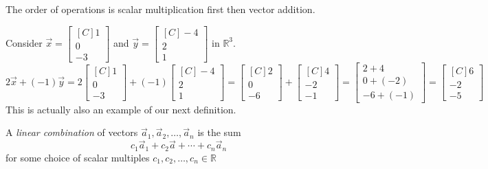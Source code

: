 The order of operations is scalar multiplication first then vector addition.

\begin{example}
Consider $\vec{x}=\begin{bmatrix*}[C]1\\ 0 \\ -3\end{bmatrix*}$ and
$\vec{y}=\begin{bmatrix*}[C]-4\\ 2 \\ 1\end{bmatrix*}$ in $\mathbb{R}^3$.
\[
2\vec{x}+(-1)\vec{y}=
2\begin{bmatrix*}[C]1\\ 0 \\ -3\end{bmatrix*}+
(-1)\begin{bmatrix*}[C]-4\\ 2 \\ 1\end{bmatrix*}=
\begin{bmatrix*}[C]2\\ 0 \\ -6\end{bmatrix*}+
\begin{bmatrix*}[C]4\\ -2 \\ -1\end{bmatrix*}=
\begin{bmatrix}2+4\\ 0+(-2) \\ -6+(-1)\end{bmatrix}=
\begin{bmatrix*}[C]6\\ -2 \\ -5\end{bmatrix*}
\]
This is actually also an example of our next definition.
\end{example}

\begin{definition}
A \emph{linear combination} of vectors $\vec{a}_1, \vec{a}_2, \ldots,
\vec{a}_n$ is the sum
\[c_1\vec{a}_1+c_2\vec{a}+\cdots+c_n\vec{a}_n\]
for some choice of scalar multiples $c_1,c_2, \ldots, c_n \in \mathbb{R}$
\end{definition}


